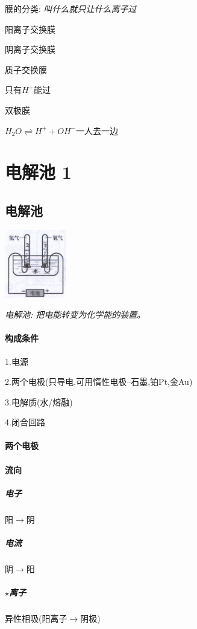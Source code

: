 \documentclass[10pt,cn]{elegantbook}
\begin{document}
膜的分类:
 \textit{叫什么就只让什么离子过}

阳离子交换膜%

阴离子交换膜

质子交换膜

只有$H^{+}$能过

双极膜

$H_{2}O\rightleftharpoons H^{+}+OH^{-}$一人去一边

\section{电解池 1}

\subsection{电解池}

\begin{center}
	\includegraphics[max width=0.2\textwidth]{image/c19.jpg}
\end{center}



\textit{电解池: 把电能转变为化学能的装置。}

\paragraph{构成条件}

1.电源

2.两个电极(只导电,可用惰性电极--石墨,铂Pt,金Au)

3.电解质(水/熔融)

4.闭合回路

\paragraph{两个电极}

\paragraph{流向}

\subparagraph*{电子}

阳$\rightarrow$阴

\subparagraph*{电流}

阴$\rightarrow$阳

\subparagraph*{$\star$离子}

异性相吸(阳离子$\rightarrow$阴极)
\end{document}
